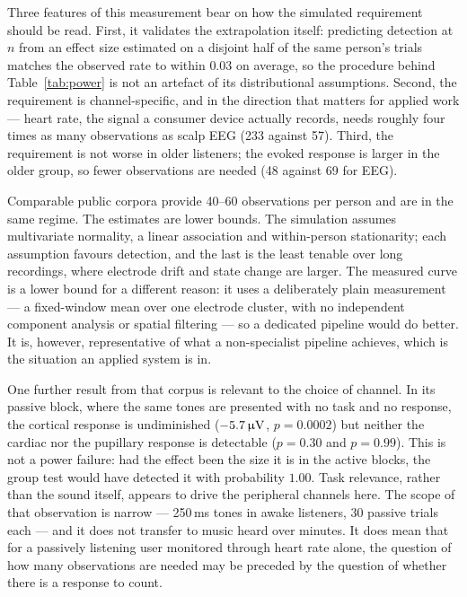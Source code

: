 Three features of this measurement bear on how the simulated requirement should be
read. First, it validates the extrapolation itself: predicting detection at $n$
from an effect size estimated on a disjoint half of the same person's trials
matches the observed rate to within $0.03$ on average, so the procedure behind
Table~\ref{tab:power} is not an artefact of its distributional assumptions.
Second, the requirement is channel-specific, and in the direction that matters for
applied work --- heart rate, the signal a consumer device actually records, needs
roughly four times as many observations as scalp EEG (233 against 57). Third, the
requirement is not worse in older listeners; the evoked response is larger in the
older group, so fewer observations are needed (48 against 69 for EEG).

Comparable public corpora provide 40--60 observations per person and are in the
same regime. The estimates are lower bounds. The simulation assumes multivariate
normality, a linear association and within-person stationarity; each assumption
favours detection, and the last is the least tenable over long recordings, where
electrode drift and state change are larger. The measured curve is a lower bound
for a different reason: it uses a deliberately plain measurement --- a
fixed-window mean over one electrode cluster, with no independent component
analysis or spatial filtering --- so a dedicated pipeline would do better. It is,
however, representative of what a non-specialist pipeline achieves, which is the
situation an applied system is in.

One further result from that corpus is relevant to the choice of channel. In its
passive block, where the same tones are presented with no task and no response,
the cortical response is undiminished ($-5.7\,\upmu\mathrm{V}$, $p = 0.0002$) but neither the
cardiac nor the pupillary response is detectable ($p = 0.30$ and $p = 0.99$). This
is not a power failure: had the effect been the size it is in the active blocks,
the group test would have detected it with probability $1.00$. Task relevance,
rather than the sound itself, appears to drive the peripheral channels here. The
scope of that observation is narrow --- 250\,ms tones in awake listeners, 30
passive trials each --- and it does not transfer to music heard over minutes. It
does mean that for a passively listening user monitored through heart rate alone,
the question of how many observations are needed may be preceded by the question
of whether there is a response to count.

